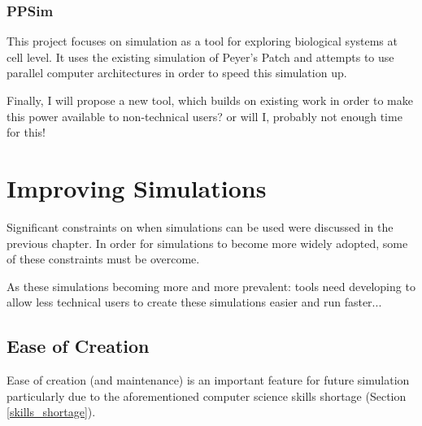 \documentclass{UoYCSproject}
\begin{document}
\subsection{PPSim}
\label{ppsim}
This project focuses on simulation as a tool for exploring biological systems at cell level. It uses the existing simulation of Peyer's Patch\cite{kieran_thesis} and attempts to use parallel computer architectures in order to speed this simulation up. %

Finally, I will propose a new tool, which builds on existing work in order to make this power available to non-technical users? or will I, probably not enough time for this!

\chapter{Improving Simulations}
\label{improvements}
Significant constraints on when simulations can be used were discussed in the previous chapter. In order for simulations to become more widely adopted, some of these constraints must be overcome.

As these simulations becoming more and more prevalent: tools need developing to allow less technical users to create these simulations easier and run faster...

\section{Ease of Creation}
Ease of creation (and maintenance) is an important feature for future simulation particularly due to the aforementioned computer science skills shortage (Section \ref{skills_shortage}).



\end{document}
